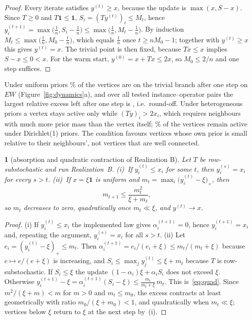 \documentclass[11pt,a4paper]{article}
\theoremstyle{definition}
\theoremstyle{plain}
\newcommand{\genpropname}{}
\newtheorem*{genprop}{\genpropname}
\newenvironment{prop}[1]{\renewcommand{\genpropname}{Proposition #1}\begin{genprop}}{\end{genprop}}
\newcommand{\one}{\mathbf{1}}
\begin{document}
\begin{proof}
Every iterate satisfies $y^{(t)}\ge x$, because the update is $\max(x,S-x)$. Since $T\ge0$ and $T\one\le\one$, $S_i=(Ty^{(t)})_i\le M_t$, hence $y^{(t+1)}_i=\max\big(\tfrac1n,S_i-\tfrac1n\big)\le\max\big(\tfrac1n,M_t-\tfrac1n\big)$. By induction $M_t\le\max\big(\tfrac1n,M_0-\tfrac tn\big)$, which equals $\tfrac1n$ once $t\ge nM_0-1$; together with $y^{(t)}\ge x$ this gives $y^{(t)}=x$. The trivial point is then fixed, because $Tx\le x$ implies $S-x\le0<x$. For the warm start, $y^{(0)}=x+Tx\le2x$, so $M_0\le2/n$ and one step suffices.
\end{proof}

Under uniform priors \TrivAOneUnif\% of the vertices are on the trivial branch after one step on $EW$ (Figure~\ref{fig:dynamics}a), and over all tested instance--operator pairs the largest relative excess left after one step is \CollapseExcess, i.e.\ round-off. Under heterogeneous priors a vertex stays active only while $(Ty)_i>2x_i$, which requires neighbours with much more prior mass than the vertex itself; \ActADirEnd\% of the vertices remain active under Dirichlet(1) priors. The condition favours vertices whose own prior is small relative to their neighbours', not vertices that are well connected.

\begin{prop}{B}[absorption and quadratic contraction of Realization B]
Let $T$ be row-substochastic and run Realization~B. (i)~If $y_i^{(t)}\le x_i$ for some $t$, then $y_i^{(s)}=x_i$ for every $s>t$. (ii)~If $x=\xi\one$ is uniform and $m_t=\max_i\big(y_i^{(t)}-\xi\big)_+$, then
\begin{equation}\label{eq:quad}
m_{t+1}\le\frac{m_t^2}{\xi+m_t},
\end{equation}
so $m_t$ decreases to zero, quadratically once $m_t\ll\xi$, and $y^{(t)}\to x$.
\end{prop}

\begin{proof}
(i) If $y_i^{(t)}\le x_i$ the implemented law gives $\alpha_i^{(t+1)}=0$, hence $y_i^{(t+1)}=x_i$ and, repeating the argument, $y_i^{(s)}=x_i$ for all $s>t$. (ii) Let $e_i=(y_i^{(t)}-\xi)_+\le m_t$. Then $\alpha_i^{(t+1)}=e_i/(e_i+\xi)\le m_t/(m_t+\xi)$ because $e\mapsto e/(e+\xi)$ is increasing, and $S_i\le\max_jy^{(t)}_j\le\xi+m_t$ because $T$ is row-substochastic. If $S_i\le\xi$ the update $(1-\alpha_i)\xi+\alpha_iS_i$ does not exceed $\xi$. Otherwise $y_i^{(t+1)}-\xi=\alpha_i^{(t+1)}(S_i-\xi)\le\frac{m_t}{m_t+\xi}\,m_t$. This is~\eqref{eq:quad}. Since $m^2/(\xi+m)<m$ for $m>0$ and $m_t\le m_0$, the excess contracts at least geometrically with ratio $m_0/(\xi+m_0)<1$, and quadratically when $m_t\ll\xi$; vertices below $\xi$ return to $\xi$ at the next step by~(i).
\end{proof}
\end{document}
